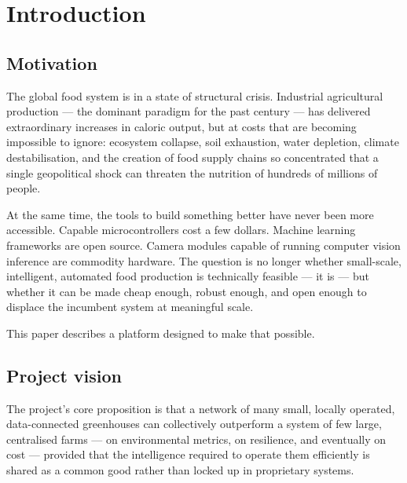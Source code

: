 \section{Introduction}

\subsection{Motivation}

The global food system is in a state of structural crisis. Industrial agricultural production --- the dominant paradigm for the past century --- has delivered extraordinary increases in caloric output, but at costs that are becoming impossible to ignore: ecosystem collapse, soil exhaustion, water depletion, climate destabilisation, and the creation of food supply chains so concentrated that a single geopolitical shock can threaten the nutrition of hundreds of millions of people.

At the same time, the tools to build something better have never been more accessible. Capable microcontrollers cost a few dollars. Machine learning frameworks are open source. Camera modules capable of running computer vision inference are commodity hardware. The question is no longer whether small-scale, intelligent, automated food production is technically feasible --- it is --- but whether it can be made cheap enough, robust enough, and open enough to displace the incumbent system at meaningful scale.

This paper describes a platform designed to make that possible.

\subsection{Project vision}

The project's core proposition is that a network of many small, locally operated, data-connected greenhouses can collectively outperform a system of few large, centralised farms --- on environmental metrics, on resilience, and eventually on cost --- provided that the intelligence required to operate them efficiently is shared as a common good rather than locked up in proprietary systems.

